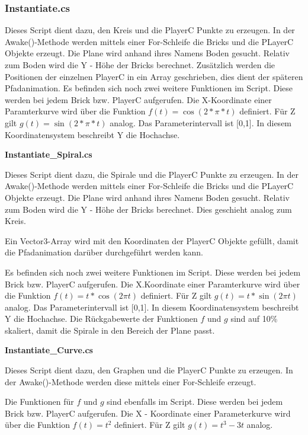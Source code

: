 \subsubsection{Instantiate.cs}
\label{Instantiate}
Dieses Script dient dazu, den Kreis und die PlayerC Punkte zu erzeugen. In der Awake()-Methode werden mittels einer For-Schleife
die Bricks und die PLayerC Objekte erzeugt. Die Plane wird anhand ihres Namens \glqq Boden{}\grqq{} gesucht. Relativ zum Boden wird die Y - Höhe der Bricks berechnet.
Zusätzlich werden die Positionen der einzelnen PlayerC in ein Array geschrieben, dies dient der späteren Pfadanimation.
Es befinden sich noch zwei weitere Funktionen im Script. Diese werden bei jedem Brick bzw. PlayerC aufgerufen. Die X-Koordinate einer Paramterkurve wird über die Funktion $ f(t) = \cos(2 * \pi * t) $ definiert. Für Z gilt $g(t) = \sin(2 * \pi * t)$ analog. Das Parameterintervall ist [0,1]. In diesem Koordinatensystem beschreibt Y die Hochachse.

\textbf{Instantiate\_Spiral.cs}
\label{InstantiateSpiral}

Dieses Script dient dazu, die Spirale und die PlayerC Punkte zu erzeugen. In der Awake()-Methode werden mittels einer For-Schleife die Bricks und die PLayerC Objekte erzeugt. Die Plane wird anhand ihres Namens \glqq Boden{}\grqq{} gesucht. Relativ zum Boden wird die Y - Höhe der Bricks berechnet. Dies geschieht analog zum Kreis.

Ein Vector3-Array wird mit den Koordinaten der PlayerC Objekte gefüllt, damit die Pfadanimation darüber durchgeführt werden kann.

Es befinden sich noch zwei weitere Funktionen im Script. Diese werden bei jedem Brick bzw. PlayerC aufgerufen. Die X.Koordinate einer Paramterkurve wird über die Funktion $ f(t) = t * \cos(2 \pi t) $ definiert. Für Z gilt $g(t) = t * \sin(2 \pi t)$ analog. Das Parameterintervall ist [0,1]. 
 In diesem Koordinatensystem beschreibt Y die Hochachse.
Die Rückgabewerte der Funktionen $f$ und $g$ sind auf 10\% skaliert, damit die Spirale in den Bereich der Plane passt.

\textbf{Instantiate\_Curve.cs}

Dieses Script dient dazu, den Graphen und die PlayerC Punkte zu erzeugen. In der Awake()-Methode werden diese mittels einer For-Schleife erzeugt. 

Die Funktionen für $f$ und $g$ sind ebenfalls im Script. Diese werden bei jedem Brick bzw. PlayerC aufgerufen. Die X - Koordinate einer Parameterkurve wird über die Funktion $ f(t) = t^{2} $ definiert. Für Z gilt $g(t) = t^{3} - 3t$ analog. 


